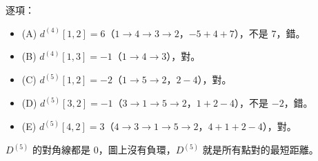 \begin{pastsoln}
逐項：
\begin{itemize}
\item (A) $d^{(4)}[1,2] = 6$（$1 \to 4 \to 3 \to 2$，$-5 + 4 + 7$），不是 $7$，錯。
\item (B) $d^{(4)}[1,3] = -1$（$1 \to 4 \to 3$），對。
\item (C) $d^{(5)}[1,2] = -2$（$1 \to 5 \to 2$，$2 - 4$），對。
\item (D) $d^{(5)}[3,2] = -1$（$3 \to 1 \to 5 \to 2$，$1 + 2 - 4$），不是 $-2$，錯。
\item (E) $d^{(5)}[4,2] = 3$（$4 \to 3 \to 1 \to 5 \to 2$，$4 + 1 + 2 - 4$），對。
\end{itemize}
$D^{(5)}$ 的對角線都是 $0$，圖上沒有負環，$D^{(5)}$ 就是所有點對的最短距離。
\end{pastsoln}
